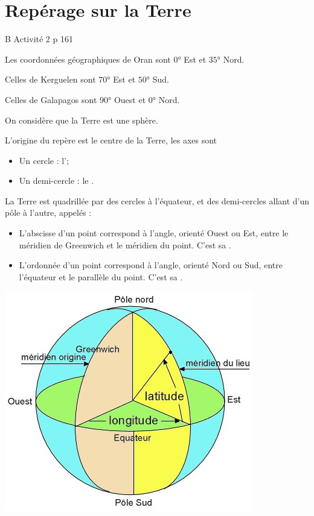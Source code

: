 \documentclass[12pt,a4paper]{article}
\begin{document}
\section{Repérage sur la Terre}

\begin{myact}{B}
	Activité 2 p 161
	
	Les coordonnées géographiques de Oran sont $0$° Est et $35$° Nord.
	
	Celles de Kerguelen sont $70$° Est et $50$° Sud.
	
	Celles de Galapagos sont $90$° Ouest et $0$° Nord.
\end{myact}


\begin{mydef}
	On considère que la Terre est une sphère.
	
	L'origine du repère est le centre de la Terre, les axes sont 
	\begin{itemize}
		\item Un cercle : l';
		\item Un demi-cercle : le .
	\end{itemize}
	
	La Terre est quadrillée par des cercles  à l'équateur, et des demi-cercles allant d'un pôle à l'autre, appelés  :
	
	\begin{multicols}{2}
				\begin{itemize}
			\item L'abscisse d'un point correspond à l'angle, orienté Ouest ou Est, entre le méridien de Greenwich et le méridien du point. C'est sa .
			\item L'ordonnée d'un point correspond à l'angle, orienté Nord ou Sud, entre l'équateur et le parallèle du point. C'est sa .
		\end{itemize}
		
		\begin{center}
			\includegraphics[scale=0.55]{img/terre}
		\end{center}
		
	\end{multicols}
	
\end{mydef}
\end{document}
